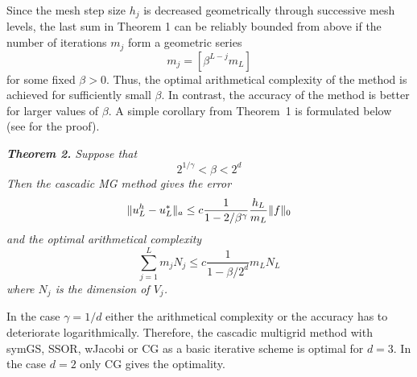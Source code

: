 Since the mesh step size $h_j$ is decreased geometrically through
successive mesh levels, the last
sum in Theorem 1 can be reliably bounded from above if the number of
iterations $m_j$ form a geometric series
$$
m_j = [\beta^{L-j} m_L]
$$
for some fixed $\beta > 0$. Thus, the optimal arithmetical complexity
of the method is achieved for sufficiently small $\beta$. In contrast,
the accuracy of the method is better for larger values of
$\beta$. A simple corollary from Theorem~1 is formulated 
below (see \cite{BD96} for the proof).\vspace*{2mm}

{\it
  \noindent
      {\bf Theorem 2.} Suppose that
      $$
      2^{1/\gamma} < \beta < 2^d
      $$
      Then the cascadic MG method gives the error
      $$
      \| u_L^h - u_L^* \|_a \le c \frac{1}{1-2/\beta^\gamma}
      \frac{h_L}{m_L} {\| f \|_0}
      $$
      and the optimal arithmetical complexity
      $$
      \sum\limits_{j=1}^L m_j N_j \le c \frac{1}{1 - \beta / 2^d} m_L N_L
      $$
      where $N_j$ is the dimension of $V_j$.
}\vspace*{2mm}

In the case $\gamma = 1/d$ either the arithmetical complexity or
the accuracy has to deteriorate logarithmically. Therefore, the
cascadic multigrid method with symGS, SSOR, wJacobi or CG as a basic
iterative scheme is optimal for $d=3$. In the case $d=2$ only CG
gives the optimality.


